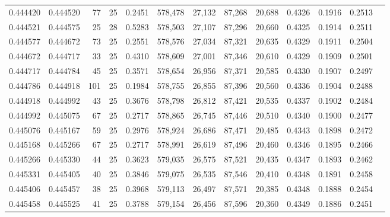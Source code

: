 \begin{tabular}{rrrrrrrrrrrrr}
0.444420 & 0.444520 &    77 &  25 &                                     0.2451 & 578,478 &  27,132 &  87,268 &  20,688 & 0.4326 & 0.1916 & 0.2513 \\
0.444521 & 0.444575 &    25 &  28 &                                     0.5283 & 578,503 &  27,107 &  87,296 &  20,660 & 0.4325 & 0.1914 & 0.2511 \\
0.444577 & 0.444672 &    73 &  25 &                                     0.2551 & 578,576 &  27,034 &  87,321 &  20,635 & 0.4329 & 0.1911 & 0.2504 \\
0.444672 & 0.444717 &    33 &  25 &                                     0.4310 & 578,609 &  27,001 &  87,346 &  20,610 & 0.4329 & 0.1909 & 0.2501 \\
0.444717 & 0.444784 &    45 &  25 &                                     0.3571 & 578,654 &  26,956 &  87,371 &  20,585 & 0.4330 & 0.1907 & 0.2497 \\
0.444786 & 0.444918 &   101 &  25 &                                     0.1984 & 578,755 &  26,855 &  87,396 &  20,560 & 0.4336 & 0.1904 & 0.2488 \\
0.444918 & 0.444992 &    43 &  25 &                                     0.3676 & 578,798 &  26,812 &  87,421 &  20,535 & 0.4337 & 0.1902 & 0.2484 \\
0.444992 & 0.445075 &    67 &  25 &                                     0.2717 & 578,865 &  26,745 &  87,446 &  20,510 & 0.4340 & 0.1900 & 0.2477 \\
0.445076 & 0.445167 &    59 &  25 &                                     0.2976 & 578,924 &  26,686 &  87,471 &  20,485 & 0.4343 & 0.1898 & 0.2472 \\
0.445168 & 0.445266 &    67 &  25 &                                     0.2717 & 578,991 &  26,619 &  87,496 &  20,460 & 0.4346 & 0.1895 & 0.2466 \\
0.445266 & 0.445330 &    44 &  25 &                                     0.3623 & 579,035 &  26,575 &  87,521 &  20,435 & 0.4347 & 0.1893 & 0.2462 \\
0.445331 & 0.445405 &    40 &  25 &                                     0.3846 & 579,075 &  26,535 &  87,546 &  20,410 & 0.4348 & 0.1891 & 0.2458 \\
0.445406 & 0.445457 &    38 &  25 &                                     0.3968 & 579,113 &  26,497 &  87,571 &  20,385 & 0.4348 & 0.1888 & 0.2454 \\
0.445458 & 0.445525 &    41 &  25 &                                     0.3788 & 579,154 &  26,456 &  87,596 &  20,360 & 0.4349 & 0.1886 & 0.2451 \\

\end{tabular}
